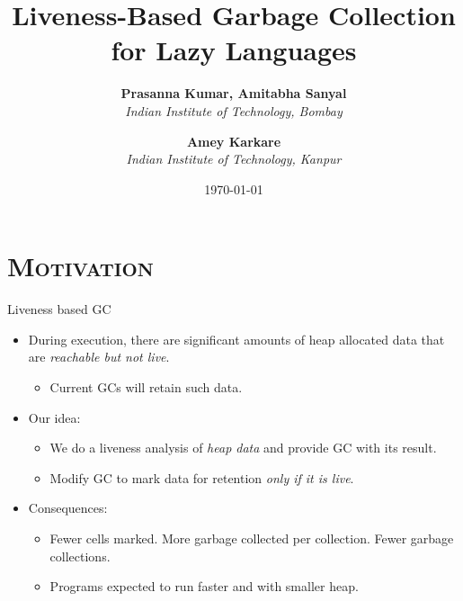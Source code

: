 \documentclass[xcolor=x11names,compress,mathserif]{beamer}
\renewcommand{\(}{\begin{columns}}
\renewcommand{\)}{\end{columns}}
\newcommand{\<}[1]{\begin{column}{#1}}
\renewcommand{\>}{\end{column}}
\begin{document}
\section{\scshape Motivation}
\begin{frame}
\title{Liveness-Based Garbage Collection for Lazy Languages}
\author{
        {\bf Prasanna Kumar, Amitabha Sanyal}\\{\it Indian Institute of
          Technology, Bombay}\\ \and
       {\bf Amey Karkare}\\{\it Indian Institute of Technology, Kanpur}
}

\date{\today}
\titlepage
\end{frame}



\begin{frame}{Liveness based GC}
    \begin{itemize}\itemsep0.75em
    \item During execution, there are significant amounts of heap allocated data
      that  are {\em  reachable but not live}.
      \begin{itemize}
      \item Current GCs will retain such data.
      \end{itemize}
    \item Our idea: 
      \begin{itemize}
      \item We do  a liveness analysis of {\em heap  data} and provide
        GC with its result.
      \item Modify GC to mark data for retention {\em only if it is live}.
      \end{itemize}
    \item Consequences:
      \begin{itemize}
      \item  Fewer cells  marked.  \pause More  garbage collected  per
        collection. \pause Fewer garbage collections. \pause
      \item Programs expected to run faster and with smaller heap.
      \end{itemize}
    \end{itemize}
\end{frame}
\end{document}
